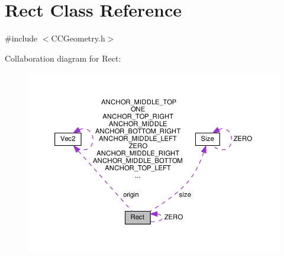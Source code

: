 \hypertarget{classRect}{}\section{Rect Class Reference}
\label{classRect}


{\ttfamily \#include $<$C\+C\+Geometry.\+h$>$}



Collaboration diagram for Rect\+:
\nopagebreak
\begin{figure}[H]
\begin{center}
\leavevmode
\includegraphics[width=350pt]{classRect__coll__graph}
\end{center}
\end{figure}
